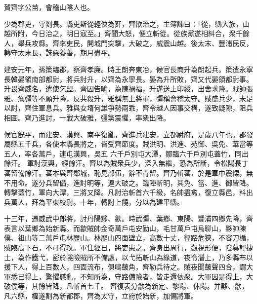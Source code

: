 \begin{pinyinscope}
 
 
 賀齊字公苗，會稽山陰人也。
 
 
 少為郡吏，守剡長。縣吏斯從輕俠為姧，齊欲治之，主簿諫曰：「從，縣大族，山越所附，今日治之，明日寇至。」齊聞大怒，便立斬從。從族黨遂相糾合，衆千餘人，舉兵攻縣。齊率吏民，開城門突擊，大破之，威震山越。後太末、豐浦民反，轉守太末長，誅惡養善，期月盡平。
 
 
 
 
 建安元年，孫策臨郡，察齊孝廉。時王朗奔東冶，候官長商升為朗起兵。策遣永寧長韓晏領南部都尉，將兵討升，以齊為永寧長。晏為升所敗，齊又代晏領都尉事。升畏齊威名，遣使乞盟。齊因告喻，為陳禍福，升遂送上印綬，出舍求降。賊帥張雅、詹彊等不願升降，反共殺升，雅稱無上將軍，彊稱會稽太守。賊盛兵少，未足以討，齊住軍息兵。雅與女壻何雄爭勢兩乖，齊令越人因事交構，遂致疑隙，阻兵相圖。齊乃進討，一戰大破雅，彊黨震懼，率衆出降。
 
 
候官旣平，而建安、漢興、南平復亂，齊進兵建安，立都尉府，是歲八年也。郡發屬縣五千兵，各使本縣長將之，皆受齊節度。賊洪明、洪進、苑御、吳免、華當等五人，率各萬戶，連屯漢興，吳五
 六千戶別屯大潭，鄒臨六千戶別屯蓋竹，同出餘汗。
 軍討漢興，經餘汗。齊以為賊衆兵少，深入無繼，恐為所斷，令松陽長丁蕃留備餘汗。蕃本與齊鄰城，恥見部伍，辭不肯留。齊乃斬蕃，於是軍中震慄，無不用命。遂分兵留備，進討明等，連大破之。臨陣斬明，其免、當、進、御皆降。轉擊蓋竹，軍向大潭，三將又降。凡討治斬首六千級，名帥盡禽，復立縣邑，料出兵萬人，拜為平東校尉。十年，轉討上饒，分以為建平縣。
 
 
十三年，遷威武中郎將，討丹陽黟、歙。時武彊、葉鄉、東陽、豐浦四鄉先降，齊表言以葉鄉為始新縣。而歙賊帥金奇萬戶屯安勤山，毛甘萬戶屯烏聊山，黟帥陳僕、祖山等二萬戶屯林歷山。林歷山四靣壁立，高數十丈，徑路危狹，不容刀楯，賊臨高下石，不可得攻。軍住經日，將吏患之。齊身出周行，觀視形便，陰募輕捷士，為作鐵弋，密於隱險賊所不備處，以弋拓斬山為緣道，夜令潛上，乃多縣布以援下人，得上百數人，四靣流布，俱鳴皷角，齊勒兵待之。賊夜聞皷聲四合，謂大軍悉已得上，驚懼惑亂，不知所為，守路備險者，皆走還依衆。大軍因是得上，大破僕等，其餘皆降，凡斬首七千。
 齊復表分歙為新定、黎陽、休陽。并黟、歙，凡六縣，權遂割為新都郡，齊為太守，立府於始新，加偏將軍。
 

\end{pinyinscope}
